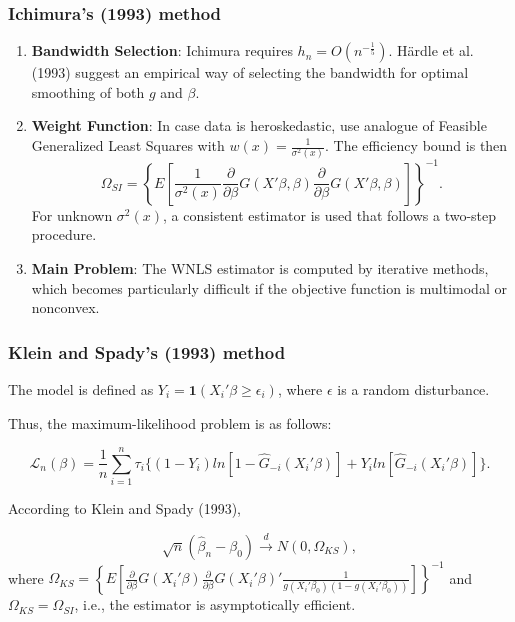 \documentclass[11pt]{beamer}
\begin{document}
\begin{frame}[t]
    \frametitle{Ichimura's (1993) method}
    
	\begin{enumerate}
		\item \textbf{Bandwidth Selection}:
Ichimura requires $h_n=O(n^{-\frac{1}{5}})$. H{\"a}rdle et al. (1993) suggest an empirical way of selecting the bandwidth for optimal smoothing of both $g$ and $\beta$.
		\item \textbf{Weight Function}:
	In case data is heroskedastic, use analogue of Feasible Generalized Least Squares with $w(x) = \frac{1}{\sigma^2(x)}$. The efficiency bound is then
		\begin{equation}
\Omega_{SI} = \left\{ E\left[\frac{1}{\sigma^2(x)}\frac{\partial}{\partial \beta}
 G(X'\beta,\beta)\frac{\partial}{\partial \beta} G(X'\beta,\beta) \right] \right\}^{-1}.
		\end{equation}
For unknown $\sigma^2(x)$, a consistent estimator is used that follows a two-step procedure.
		\item \textbf{Main Problem}:
The WNLS estimator is computed by iterative methods, which becomes particularly difficult if  the objective function is multimodal or nonconvex.

	\end{enumerate}

\end{frame}

\begin{frame}[t]
    \frametitle{Klein and Spady's (1993) method}
The model is defined as $Y_i =  \mathbf{1}{(X_i'\beta \geq \epsilon_i)}$, where $\epsilon$ is a random disturbance.

Thus, the maximum-likelihood problem is as follows:

\begin{equation}
\mathcal{L}_n(\beta) = \frac{1}{n}\sum_{i=1}^n \tau_{i}\{ (1 - Y_i)ln[ 1 - \hat{G}_{-i}(X_i'\beta)] +  Y_iln[\hat{G}_{-i}(X_i'\beta)]\}.
\end{equation}

\begin{theorem}
According to Klein and Spady (1993),

\[\sqrt{n}(\hat{\beta}_{n} - \beta_0) \stackrel{d}{\rightarrow} N(0,\Omega_{KS}),
\]
where $ \Omega_{KS} = \left\{ E\left[\frac{\partial}{\partial \beta}
 G(X_i'\beta)\frac{\partial}{\partial \beta} G(X_i'\beta)'\frac{1}{g(X_i'\beta_0)(1 - g(X_i'\beta_0))} \right]\right\}^{-1} $
 and $\Omega_{KS} = \Omega_{SI}$, i.e., the estimator is asymptotically efficient.

\end{theorem}
\end{frame}
\end{document}
